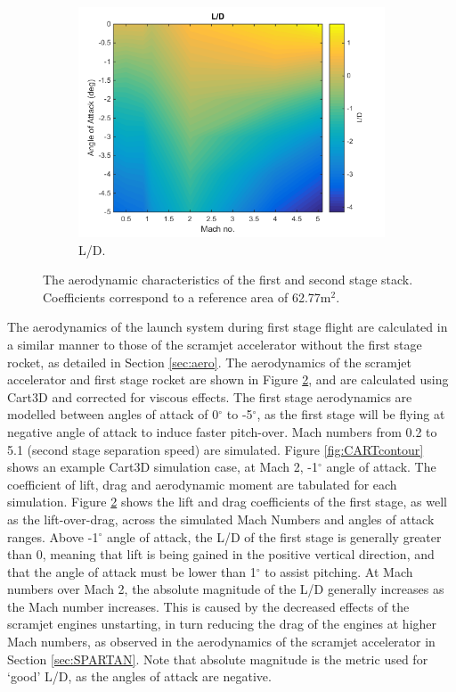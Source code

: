 \begin{figure}[ht]
\begin{subfigure}{.5\textwidth}
    		\centering
    		\includegraphics[width=0.99\linewidth]{figures/3_vehicle_design/FirstStageLD}
    		\caption{L/D.}
    		\label{fig:LD-EFirstStage}
    	\end{subfigure}
    	\caption{The aerodynamic characteristics of the first and second stage stack.  Coefficients correspond to a reference area of 62.77m$^2$.}
    	\label{fig:FirstStageAero}
    \end{figure}
  The aerodynamics of the launch system during first stage flight are calculated in a similar manner to those of the scramjet accelerator without the first stage rocket, as detailed in Section \ref{sec:aero}. 
  The aerodynamics of the scramjet accelerator and first stage rocket are shown in Figure \ref{fig:FirstStageAero}, and are calculated using Cart3D and corrected for viscous effects. The first stage aerodynamics are modelled between angles of attack of 0$^\circ$ to -5$^\circ$, as the first stage will be flying at negative angle of attack to induce faster pitch-over. Mach numbers from 0.2 to 5.1 (second stage separation speed) are simulated. Figure \ref{fig:CARTcontour} shows an example Cart3D simulation case, at Mach 2, -1$^\circ$ angle of attack. The coefficient of lift, drag and aerodynamic moment are tabulated for each simulation. Figure \ref{fig:FirstStageAero} shows the lift and drag coefficients of the first stage, as well as the lift-over-drag, across the simulated Mach Numbers and angles of attack ranges. Above -1$^\circ$ angle of attack, the L/D of the first stage is generally greater than 0, meaning that lift is being gained in the positive vertical direction, and that the angle of attack must be lower than 1$^\circ$ to assist pitching.
  At Mach numbers over Mach 2, the absolute magnitude of the L/D generally increases as the Mach number increases. This is caused by the decreased effects of the scramjet engines unstarting, in turn reducing the drag of the engines at higher Mach numbers, as observed in the aerodynamics of the scramjet accelerator in Section \ref{sec:SPARTAN}. 
   Note that absolute magnitude is the metric used for `good' L/D, as the angles of attack are negative. 
  
